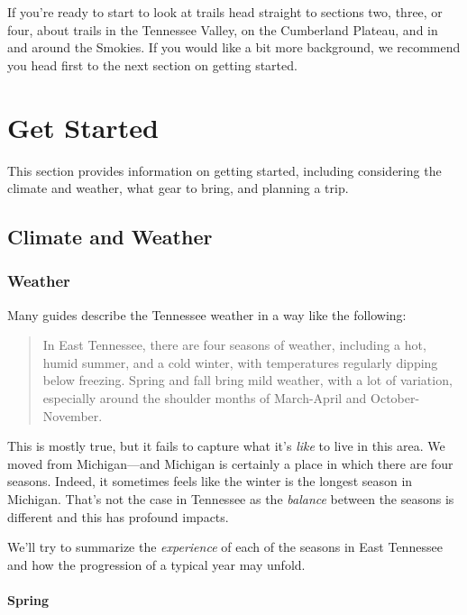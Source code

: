 \documentclass[
]{book}
\begin{document}
If you're ready to start to look at trails head straight to sections two, three, or four, about trails in the Tennessee Valley, on the Cumberland Plateau, and in and around the Smokies. If you would like a bit more background, we recommend you head first to the next section on getting started.

\hypertarget{part-get-started}{%
\part{Get Started}\label{part-get-started}}

This section provides information on getting started, including considering the climate and weather, what gear to bring, and planning a trip.

\hypertarget{climate-and-weather}{%
\chapter{Climate and Weather}\label{climate-and-weather}}

\hypertarget{weather}{%
\section{Weather}\label{weather}}

Many guides describe the Tennessee weather in a way like the following:

\begin{quote}
In East Tennessee, there are four seasons of weather, including a hot, humid summer, and a cold winter, with temperatures regularly dipping below freezing. Spring and fall bring mild weather, with a lot of variation, especially around the shoulder months of March-April and October-November.
\end{quote}

This is mostly true, but it fails to capture what it's \emph{like} to live in this area. We moved from Michigan---and Michigan is certainly a place in which there are four seasons. Indeed, it sometimes feels like the winter is the longest season in Michigan. That's not the case in Tennessee as the \emph{balance} between the seasons is different and this has profound impacts.

We'll try to summarize the \emph{experience} of each of the seasons in East Tennessee and how the progression of a typical year may unfold.

\hypertarget{spring}{%
\subsection{Spring}\label{spring}}
\end{document}
